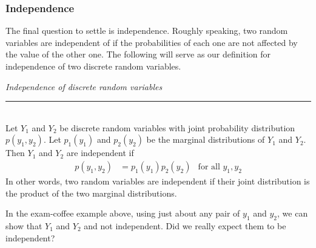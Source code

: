 \documentclass[12pt]{article}
\theoremstyle{definition}
\theoremstyle{remark}
\begin{document}
\subsubsection{Independence}
The final question to settle is independence. Roughly speaking, two random variables are independent of if the probabilities of each one are not affected by the value of the other one. The following will serve as our definition for independence of two discrete random variables.

\begin{framed}
\emph{Independence of discrete random variables}\\
  \rule{\dimexpr{}\fboxrule}{.1pt} \\
Let $Y_1$ and $Y_2$ be discrete random variables with joint probability distribution $p(y_1, y_2)$. Let $p_1(y_1)$ and $p_2(y_2)$ be the marginal distributions of $Y_1$ and $Y_2$. Then $Y_1$ and $Y_2$ are independent if
\begin{align*}
p(y_1, y_2) &= p_1(y_1)p_2(y_2) & \text{for all }y_1, y_2
\end{align*}
In other words, two random variables are independent if their joint distribution is the product of the two marginal distributions.
\end{framed}

In the exam-coffee example above, using just about any pair of $y_1$ and $y_2$, we can show that $Y_1$ and $Y_2$ and not independent. Did we really expect them to be independent?
\end{document}
